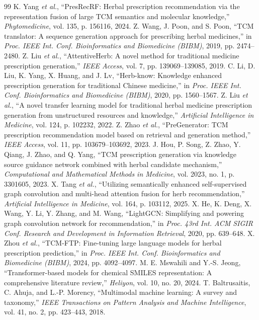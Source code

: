 \documentclass[journal,twoside,web]{ieeecolor}
\begin{document}
\begin{thebibliography}{99}
 K. Yang \textit{et al.}, ``PresRecRF: Herbal prescription recommendation via the representation fusion of large TCM semantics and molecular knowledge,'' \textit{Phytomedicine}, vol. 135, p. 156116, 2024.
 Z. Wang, J. Poon, and S. Poon, ``TCM translator: A sequence generation approach for prescribing herbal medicines,'' in \textit{Proc. IEEE Int. Conf. Bioinformatics and Biomedicine (BIBM)}, 2019, pp. 2474--2480.
 Z. Liu \textit{et al.}, ``AttentiveHerb: A novel method for traditional medicine prescription generation,'' \textit{IEEE Access}, vol. 7, pp. 139069--139085, 2019.
 C. Li, D. Liu, K. Yang, X. Huang, and J. Lv, ``Herb-know: Knowledge enhanced prescription generation for traditional Chinese medicine,'' in \textit{Proc. IEEE Int. Conf. Bioinformatics and Biomedicine (BIBM)}, 2020, pp. 1560--1567.
 Z. Liu \textit{et al.}, ``A novel transfer learning model for traditional herbal medicine prescription generation from unstructured resources and knowledge,'' \textit{Artificial Intelligence in Medicine}, vol. 124, p. 102232, 2022.
 Z. Zhao \textit{et al.}, ``PreGenerator: TCM prescription recommendation model based on retrieval and generation method,'' \textit{IEEE Access}, vol. 11, pp. 103679--103692, 2023.
 J. Hou, P. Song, Z. Zhao, Y. Qiang, J. Zhao, and Q. Yang, ``TCM prescription generation via knowledge source guidance network combined with herbal candidate mechanism,'' \textit{Computational and Mathematical Methods in Medicine}, vol. 2023, no. 1, p. 3301605, 2023.
 X. Tang \textit{et al.}, ``Utilizing semantically enhanced self-supervised graph convolution and multi-head attention fusion for herb recommendation,'' \textit{Artificial Intelligence in Medicine}, vol. 164, p. 103112, 2025.
 X. He, K. Deng, X. Wang, Y. Li, Y. Zhang, and M. Wang, ``LightGCN: Simplifying and powering graph convolution network for recommendation,'' in \textit{Proc. 43rd Int. ACM SIGIR Conf. Research and Development in Information Retrieval}, 2020, pp. 639--648.
 X. Zhou \textit{et al.}, ``TCM-FTP: Fine-tuning large language models for herbal prescription prediction,'' in \textit{Proc. IEEE Int. Conf. Bioinformatics and Biomedicine (BIBM)}, 2024, pp. 4092--4097.
 M. E. Mswahili and Y.-S. Jeong, ``Transformer-based models for chemical SMILES representation: A comprehensive literature review,'' \textit{Heliyon}, vol. 10, no. 20, 2024.
 T. Baltrusaitis, C. Ahuja, and L.-P. Morency, ``Multimodal machine learning: A survey and taxonomy,'' \textit{IEEE Transactions on Pattern Analysis and Machine Intelligence}, vol. 41, no. 2, pp. 423--443, 2018.

\end{thebibliography}
\end{document}
